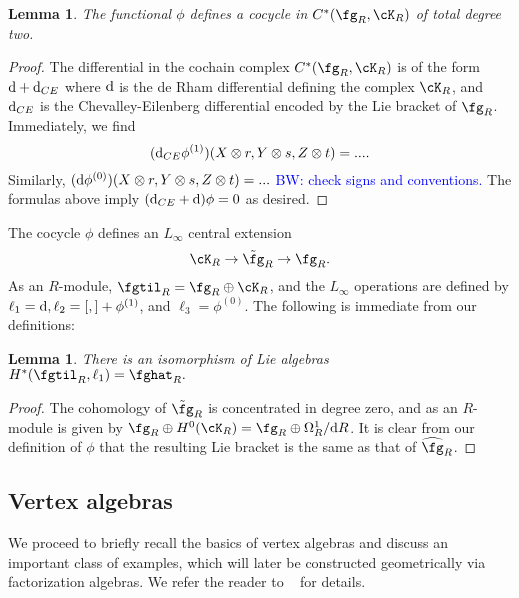 \documentclass[12pt]{amsart}
\newtheorem{lemma}[theorem]{Lemma}
\theoremstyle{definition}
\theoremstyle{remark}
\newcommand{\R}{R}
\def\d{{\rm d}}
\def\tensor{\otimes}
\def\Hat{\widehat}
\def\brian{\textcolor{blue}{BW: }\textcolor{blue}}
\begin{document}
\begin{lemma}
The functional $\phi$ defines a cocycle in $C^*(\fg_{R}, \cK_{R}) $ of total degree two.
\end{lemma}
\begin{proof}
The differential in the cochain complex $C^*(\fg_R , \cK_R)$ is of the form $\d + \d_{CE}$ where $\d$ is the de Rham differential defining the complex $\cK_R$, and $\d_{CE}$ is the Chevalley-Eilenberg differential encoded by the Lie bracket of $\fg_R$.
Immediately, we find
\[
(\d_{CE}\phi^{(1)})(X \tensor r, Y \tensor s, Z \tensor t) = .... 
\]
Similarly, $(\d \phi^{(0)})(X \tensor r, Y \tensor s, Z \tensor t) = ...$
\brian{check signs and conventions.}
The formulas above imply $(\d_{CE} + \d) \phi = 0$ as desired.
\end{proof}

The cocycle $\phi$ defines an $L_{\infty}$ central extension
\[
\cK_R \to \Tilde{\fg}_R \to \fg_R .
\]
As an $R$-module, $\fgtil_{R} = \fg_R \oplus \cK_R$, and the $L_\infty$ operations are defined by $\ell_1 = \d, \ell_2 = [,] + \phi^{(1)}$, and $\ell_3 = \phi^{(0)}$.
The following is immediate from our definitions:

\begin{lemma}
There is an isomorphism of Lie algebras
$H^{*}(\fgtil_{\R}, \ell_1) = \fghat_{\R}.$
\end{lemma} 
\begin{proof}
The cohomology of $\Tilde{\fg}_R$ is concentrated in degree zero, and as an $R$-module is given by $\fg_R \oplus H^0(\cK_R) = \fg_R \oplus \Omega^1_R / \d R$. 
It is clear from our definition of $\phi$ that the resulting Lie bracket is the same as that of $\Hat{\fg}_R$. 
\end{proof}

\subsection{Vertex algebras}

We proceed to briefly recall the basics of vertex algebras and discuss an important class of examples, which will later be constructed geometrically via factorization algebras. We refer the reader to ~\cite{FBZ, Kac} for details. 
\end{document}
